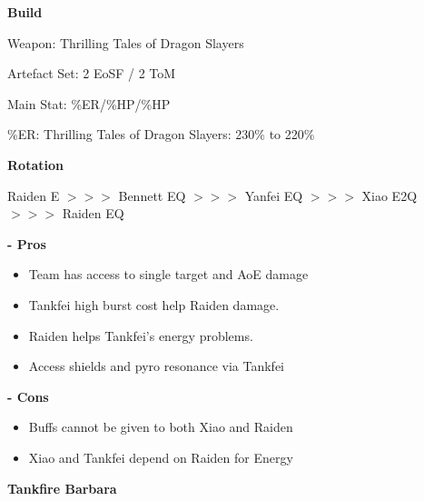 \documentclass[11pt]{article}
\begin{document}
\textbf{\small{Build}}

Weapon: Thrilling Tales of Dragon Slayers

Artefact Set: 2 EoSF / 2 ToM 

Main Stat: \%ER/\%HP/\%HP 

\%ER: Thrilling Tales of Dragon Slayers: 230\% to 220\%

\textbf{\small{Rotation}} 

\begin{center}
    Raiden E $>>>$ Bennett EQ $>>>$ Yanfei EQ $>>>$ Xiao E2Q $>>>$ Raiden EQ
\end{center} 

\textbf{\small{- Pros}}

\begin{itemize}
    \item Team has access to single target and AoE damage
    \item Tankfei high burst cost help Raiden damage. 
    \item Raiden helps Tankfei's energy problems. 
    \item Access shields and pyro resonance via Tankfei
\end{itemize}

\textbf{\small{- Cons}}

\begin{itemize}
    \item Buffs cannot be given to both Xiao and Raiden
    \item Xiao and Tankfei depend on Raiden for Energy 
\end{itemize}

\newpage 

\textbf{Tankfire Barbara}
\end{document}
